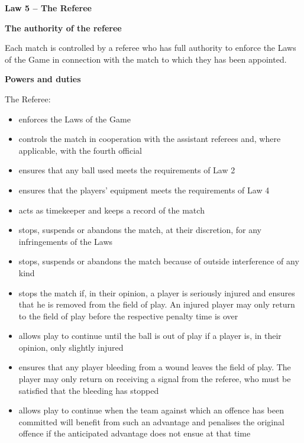 \clearpage
\sffamily
{\bfseries\color[rgb]{0.4,0.4,0.4}
Law 5 -- The Referee}
{}

\bigskip

{\bfseries The authority of the referee}

\headlinebox

Each match is controlled by a referee who has full authority to enforce the Laws of the Game in connection with the match to which they has been appointed.

\bigskip

{\bfseries Powers and duties}

\headlinebox

The Referee:

\begin{itemize}
\item enforces the Laws of the Game
\item controls the match in cooperation with the assistant referees and, where applicable, with the fourth official
\item ensures that any ball used meets the requirements of Law 2 
\item ensures that the players' equipment meets the requirements of Law 4
\item acts as timekeeper and keeps a record of the match
\item stops, suspends or abandons the match, at their discretion, for any infringements of the Laws
\item stops, suspends or abandons the match because of outside interference of any kind
\item stops the match if, in their opinion, a player is seriously injured and ensures that he is removed from the field of play. An injured player may only return to the field of play  before the respective penalty time is over 
\item allows play to continue until the ball is out of play if a player is, in their opinion, only slightly injured 
\item ensures that any player bleeding from a wound leaves the field of play. The player may only return on receiving a signal from the referee, who must be satisfied that the bleeding has stopped
\item allows play to continue when the team against which an offence has been committed will benefit from such an advantage and penalises the original offence if the anticipated advantage does not ensue at that time

\end{itemize}

